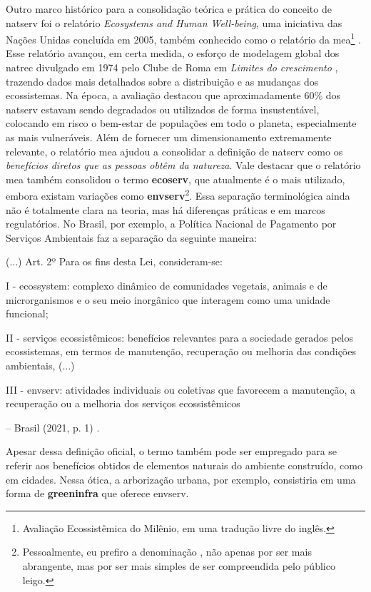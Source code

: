 \documentclass[./main.tex]{subfiles}
\begin{document}
\par Outro marco histórico para a consolidação teórica e prática do conceito de \gls{natserv} foi o relatório \textit{Ecosystems and Human Well-being}, uma iniciativa das Nações Unidas concluída em 2005, também conhecido como o relatório da \acrfull{mea}\footnote{Avaliação Ecossistêmica do Milênio, em uma tradução livre do inglês.} \cite{MEA2005a}. Esse relatório avançou, em certa medida, o esforço de modelagem global dos \gls{natrec} divulgado em 1974 pelo Clube de Roma em \textit{Limites do crescimento} \cite{meadows1974}, trazendo dados mais detalhados sobre a distribuição e as mudanças dos ecossistemas. Na época, a avaliação destacou que aproximadamente 60\% dos \gls{natserv} estavam sendo degradados ou utilizados de forma insustentável, colocando em risco o bem-estar de populações em todo o planeta, especialmente as mais vulneráveis. Além de fornecer um dimensionamento extremamente relevante, o relatório \acrshort{mea} ajudou a consolidar a definição de \gls{natserv} como os \textit{benefícios diretos que as pessoas obtêm da natureza}. Vale destacar que o relatório \acrshort{mea} também consolidou o termo \textbf{\gls{ecoserv}}, que atualmente é o mais utilizado, embora existam variações como \textbf{\gls{envserv}}\footnote{Pessoalmente, eu prefiro a denominação , não apenas por ser mais abrangente, mas por ser mais simples de ser compreendida pelo público leigo.}. Essa separação terminológica ainda não é totalmente clara na \gls{teoria}, mas há diferenças práticas e em marcos regulatórios. No Brasil, por exemplo, a Política Nacional de Pagamento por Serviços Ambientais faz a separação da seguinte maneira:

\begin{adjustwidth}{100pt}{0pt}
\medskip
\small 
(...)
Art. 2º Para os fins desta Lei, consideram-se:

I - ecos\gls{system}: complexo dinâmico de comunidades vegetais, animais e de microrganismos e o seu meio inorgânico que interagem como uma unidade funcional; 

II - serviços ecossistêmicos: benefícios relevantes para a sociedade gerados pelos ecossistemas, em termos de manutenção, recuperação ou melhoria das condições ambientais, (...)

III - \gls{envserv}: atividades individuais ou coletivas que favorecem a manutenção, a recuperação ou a melhoria dos serviços ecossistêmicos

-- Brasil (2021, p. 1) \cite{brasil2021}.
\medskip
\end{adjustwidth}
\noindent Apesar dessa definição oficial, o termo  também pode ser empregado para se referir aos benefícios obtidos de elementos naturais do ambiente construído, como em cidades. Nessa ótica, a arborização urbana, por exemplo, consistiria em uma forma de \textbf{\gls{greeninfra}} que oferece \gls{envserv}.
\end{document}
